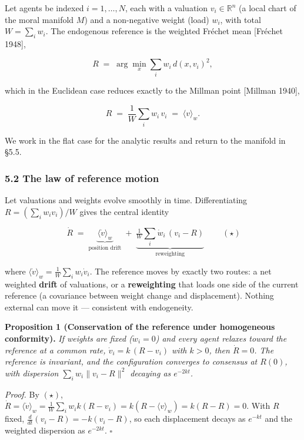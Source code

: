 \documentclass[
]{article}
\begin{document}
Let agents be indexed \(i = 1,\dots,N\), each with a valuation
\(v_i \in \mathbb{R}^n\) (a local chart of the moral manifold \(M\)) and
a non-negative weight (load) \(w_i\), with total \(W = \sum_i w_i\). The
endogenous reference is the weighted Fréchet mean {[}Fréchet 1948{]},

\[ R \;=\; \arg\min_x \sum_i w_i\, d(x, v_i)^2, \]

which in the Euclidean case reduces exactly to the Millman point
{[}Millman 1940{]},

\[ R \;=\; \frac{1}{W}\sum_i w_i\, v_i \;=\; \langle v\rangle_w . \]

We work in the flat case for the analytic results and return to the
manifold in §5.5.

\subsubsection{5.2 The law of reference
motion}\label{the-law-of-reference-motion}

Let valuations and weights evolve smoothly in time. Differentiating
\(R = (\sum_i w_i v_i)/W\) gives the central identity

\[ \boxed{\ \dot R \;=\; \underbrace{\langle \dot v\rangle_w}_{\text{position drift}} \;+\; \underbrace{\tfrac{1}{W}\sum_i \dot w_i\,(v_i - R)}_{\text{reweighting}}\ } \qquad(\star) \]

where \(\langle \dot v\rangle_w = \tfrac{1}{W}\sum_i w_i \dot v_i\). The
reference moves by exactly two routes: a net weighted \textbf{drift} of
valuations, or a \textbf{reweighting} that loads one side of the current
reference (a covariance between weight change and displacement). Nothing
external can move it --- consistent with endogeneity.

\textbf{Proposition 1 (Conservation of the reference under homogeneous
conformity).} \emph{If weights are fixed (\(\dot w_i = 0\)) and every
agent relaxes toward the reference at a common rate,
\(\dot v_i = k\,(R - v_i)\) with \(k>0\), then \(\dot R = 0\). The
reference is invariant, and the configuration converges to consensus at
\(R(0)\), with dispersion \(\sum_i w_i \lVert v_i - R\rVert^2\) decaying
as \(e^{-2kt}\).}

\emph{Proof.} By \((\star)\),
\(\dot R = \langle \dot v\rangle_w = \tfrac{1}{W}\sum_i w_i k (R - v_i) = k(R - \langle v\rangle_w) = k(R - R) = 0\).
With \(R\) fixed, \(\tfrac{d}{dt}(v_i - R) = -k(v_i - R)\), so each
displacement decays as \(e^{-kt}\) and the weighted dispersion as
\(e^{-2kt}\). \(\square\)
\end{document}

